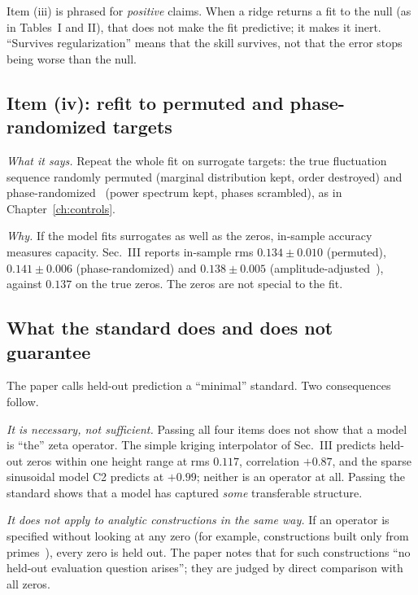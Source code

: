 \begin{pitfall}
Item (iii) is phrased for \emph{positive} claims. When a ridge returns a fit to the null (as in Tables~I and II), that does not make the fit predictive; it makes it inert. ``Survives regularization'' means that the skill survives, not that the error stops being worse than the null.
\end{pitfall}

\subsection{Item (iv): refit to permuted and phase-randomized targets}

\emph{What it says.} Repeat the whole fit on surrogate targets: the true fluctuation sequence randomly permuted (marginal distribution kept, order destroyed) and phase-randomized~\cite{theiler} (power spectrum kept, phases scrambled), as in Chapter~\ref{ch:controls}.

\emph{Why.} If the model fits surrogates as well as the zeros, in-sample accuracy measures capacity. Sec.~III reports in-sample rms $0.134\pm0.010$ (permuted), $0.141\pm0.006$ (phase-randomized) and $0.138\pm0.005$ (amplitude-adjusted~\cite{schreiber}), against $0.137$ on the true zeros. The zeros are not special to the fit.

\subsection{What the standard does and does not guarantee}

The paper calls held-out prediction a ``minimal'' standard. Two consequences follow.

\emph{It is necessary, not sufficient.} Passing all four items does not show that a model is ``the'' zeta operator. The simple kriging interpolator of Sec.~III predicts held-out zeros within one height range at rms $0.117$, correlation $+0.87$, and the sparse sinusoidal model C2 predicts at $+0.99$; neither is an operator at all. Passing the standard shows that a model has captured \emph{some} transferable structure.

\emph{It does not apply to analytic constructions in the same way.} If an operator is specified without looking at any zero (for example, constructions built only from primes~\cite{connes26,zetatriples}), every zero is held out. The paper notes that for such constructions ``no held-out evaluation question arises''; they are judged by direct comparison with all zeros.

